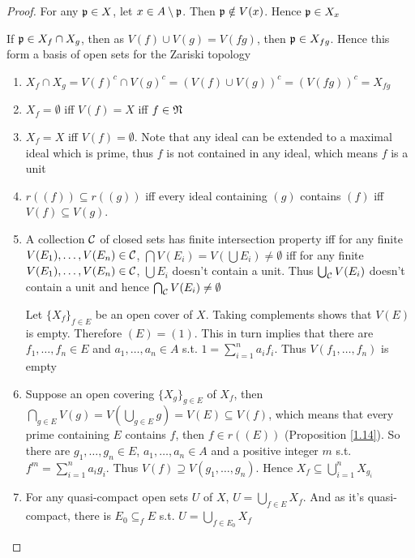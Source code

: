 \documentclass[11pt]{article}
\begin{document}
\begin{proof}
For any \(\mathfrak{p}\in X\), let \(x\in A\setminus\mathfrak{p}\). Then \(\mathfrak{p}\notin V(x)\). Hence \(\mathfrak{p}\in X_x\)

If \(\mathfrak{p}\in X_f\cap X_g\), then as \(V(f)\cup V(g)=V(fg)\), then \(\mathfrak{p}\in X_{fg}\). Hence this form a basis of
open sets for the Zariski topology

\begin{enumerate}
\item \(X_f\cap X_g=V(f)^c\cap V(g)^c=(V(f)\cup V(g))^c=(V(fg))^c=X_{fg}\)

\item \(X_f=\emptyset\) iff \(V(f)=X\) iff \(f\in\mathfrak{N}\)
\item \(X_f=X\) iff \(V(f)=\emptyset\). Note that any ideal can be extended to a maximal ideal which is
prime, thus \(f\) is not contained in any ideal, which means \(f\) is a unit
\item \(r((f))\subseteq r((g))\) iff every ideal containing \((g)\) contains \((f)\) iff \(V(f)\subseteq V(g)\).
\item A collection \(\mathcal{C}\) of closed sets has finite intersection property iff for any
finite \(V(E_1),\dots,V(E_n)\in\mathcal{C}\), \(\bigcap V(E_i)=V(\bigcup E_i)\neq\emptyset\) iff for any
finite \(V(E_1),\dots,V(E_n)\in\mathcal{C}\), \(\bigcup E_i\) doesn't contain a unit. Thus \(\bigcup_{\mathcal{C}}V(E_i)\) doesn't
contain a unit and hence \(\bigcap_{\mathcal{C}} V(E_i)\neq\emptyset\)

Let \(\{X_f\}_{f\in E}\) be an open cover of \(X\). Taking complements shows that \(V(E)\) is
empty. Therefore \((E)=(1)\). This in turn implies that there are \(f_1,\dots,f_n\in E\)
and \(a_1,\dots,a_n\in A\) s.t. \(1=\sum_{i=1}^na_if_i\). Thus \(V(f_1,\dots,f_n)\) is empty
\item Suppose an open covering \(\{X_g\}_{g\in E}\) of \(X_f\),
then \(\bigcap_{g\in E}V(g)=V(\bigcup_{g\in E}g)=V(E)\subseteq V(f)\), which means that every prime containing \(E\)
contains \(f\), then \(f\in r((E))\) (Proposition \ref{1.14}). So there
are \(g_1,\dots,g_n\in E\), \(a_1,\dots,a_n\in A\) and a positive integer \(m\) s.t. \(f^m=\sum_{i=1}^na_ig_i\).
Thus \(V(f)\supseteq V(g_1,\dots,g_n)\). Hence \(X_f\subseteq\bigcup_{i=1}^n X_{g_i}\)
\item For any quasi-compact open sets \(U\) of \(X\), \(U=\bigcup_{f\in E}X_f\). And as it's quasi-compact,
there is \(E_0\subseteq_fE\) s.t. \(U=\bigcup_{f\in E_0}X_f\)
\end{enumerate}
\end{proof}
\end{document}

